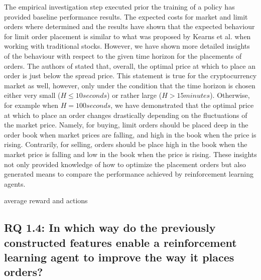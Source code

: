     The empirical investigation step executed prior the training of a policy has provided baseline performance results.
    The expected costs for market and limit orders where determined and the results have shown that the expected behaviour for limit order placement is similar to what was proposed by Kearns et al. \cite{nevmyvaka2005electronic} when working with traditional stocks.
    However, we have shown more detailed insights of the behaviour with respect to the given time horizon for the placements of orders.
    The authors of \cite{nevmyvaka2005electronic} stated that, overall, the optimal price at which to place an order is just below the spread price.
    This statement is true for the cryptocurrency market as well, however, only under the condition that the time horizon is chosen either very small ($H\leq10 seconds$) or rather large ($H>15 minutes$).
    Otherwise, for example when $H=100 seconds$, we have demonstrated that the optimal price at which to place an order changes drastically depending on the fluctuations of the market price.
    Namely, for buying, limit orders should be placed deep in the order book when market prices are falling, and high in the book when the price is rising.
    Contrarily, for selling, orders should be place high in the book when the market price is falling and low in the book when the price is rising.
    These insights not only provided knowledge of how to optimize the placement orders but also generated means to compare the performance achieved by reinforcement learning agents.
    
    average reward and actions
    
\subsection{RQ 1.4: In which way do the previously constructed features enable a reinforcement learning agent to improve the way it places orders?}

